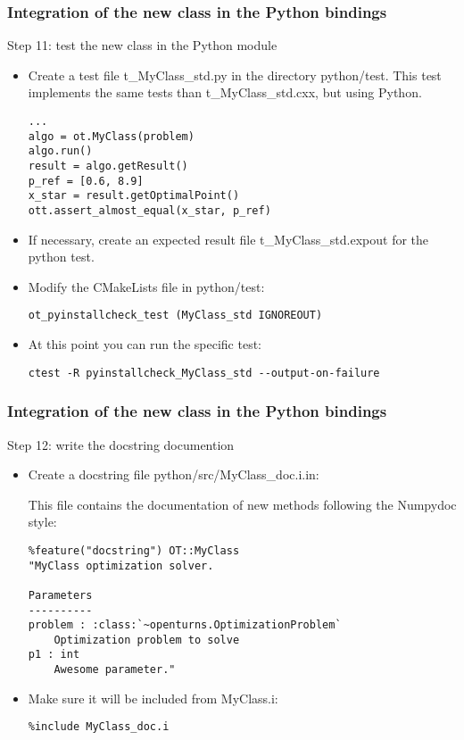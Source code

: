 \documentclass[8pt]{beamer}
\begin{document}
\begin{frame}[fragile]
  \frametitle{Integration of the new class in the Python bindings}
  \begin{block}{Step 11: test the new class in the Python module}
    \begin{itemize}
    \item Create a test file t\_MyClass\_std.py in the directory python/test. This test implements the same tests than t\_MyClass\_std.cxx, but using Python.
\begin{lstlisting}
...
algo = ot.MyClass(problem)
algo.run()
result = algo.getResult()
p_ref = [0.6, 8.9]
x_star = result.getOptimalPoint()
ott.assert_almost_equal(x_star, p_ref)
\end{lstlisting}
        
    \item If necessary, create an expected result file t\_MyClass\_std.expout for the python test.
    \item Modify the CMakeLists file in python/test:
\begin{lstlisting}
ot_pyinstallcheck_test (MyClass_std IGNOREOUT)
\end{lstlisting}

\item At this point you can run the specific test:\\
\begin{lstlisting}
ctest -R pyinstallcheck_MyClass_std --output-on-failure
\end{lstlisting}

    \end{itemize}
  \end{block}
\end{frame}
\begin{frame}[containsverbatim]
  \frametitle{Integration of the new class in the Python bindings}
  \begin{block}{Step 12: write the docstring documention}
    \begin{itemize}
    \item Create a docstring file python/src/MyClass\_doc.i.in:
    
    This file contains the documentation of new methods following the Numpydoc style:

    \begin{lstlisting}
%feature("docstring") OT::MyClass
"MyClass optimization solver.

Parameters
----------
problem : :class:`~openturns.OptimizationProblem`
    Optimization problem to solve
p1 : int
    Awesome parameter."
\end{lstlisting}

\item Make sure it will be included from MyClass.i:\\
\begin{lstlisting}
%include MyClass_doc.i
\end{lstlisting}
\end{itemize}
  \end{block}
\end{frame}
\end{document}
